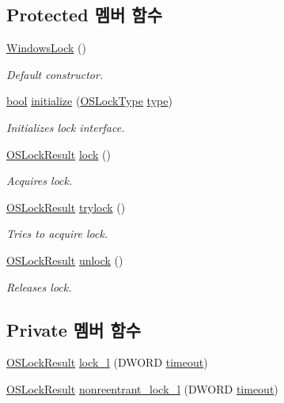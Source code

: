 \subsection*{Protected 멤버 함수}
\begin{DoxyCompactItemize}
\item 
\hyperlink{class_windows_lock_af8d42c76828ff4a315b0e2019a4e56bf}{Windows\+Lock} ()
\begin{DoxyCompactList}\small\item\em Default constructor. \end{DoxyCompactList}\item 
\hyperlink{avb__gptp_8h_af6a258d8f3ee5206d682d799316314b1}{bool} \hyperlink{class_windows_lock_abe9590069aa14b3a011b299110c7d50f}{initialize} (\hyperlink{avbts__oslock_8hpp_a88e6fcd587e202a0bf3d0318d8fff8bb}{O\+S\+Lock\+Type} \hyperlink{class_windows_lock_aeab5ee1f363ea475ef801f98a1da7838}{type})
\begin{DoxyCompactList}\small\item\em Initializes lock interface. \end{DoxyCompactList}\item 
\hyperlink{avbts__oslock_8hpp_a6ade377184a937ebffbe2a94b7369a64}{O\+S\+Lock\+Result} \hyperlink{class_windows_lock_aefc4b18353917a86c322d3831c882c09}{lock} ()
\begin{DoxyCompactList}\small\item\em Acquires lock. \end{DoxyCompactList}\item 
\hyperlink{avbts__oslock_8hpp_a6ade377184a937ebffbe2a94b7369a64}{O\+S\+Lock\+Result} \hyperlink{class_windows_lock_a098e16631cf8124ba7d5b0c8bacaddef}{trylock} ()
\begin{DoxyCompactList}\small\item\em Tries to acquire lock. \end{DoxyCompactList}\item 
\hyperlink{avbts__oslock_8hpp_a6ade377184a937ebffbe2a94b7369a64}{O\+S\+Lock\+Result} \hyperlink{class_windows_lock_ad76539cc13c8522878b489db1fb1d2f1}{unlock} ()
\begin{DoxyCompactList}\small\item\em Releases lock. \end{DoxyCompactList}\end{DoxyCompactItemize}
\subsection*{Private 멤버 함수}
\begin{DoxyCompactItemize}
\item 
\hyperlink{avbts__oslock_8hpp_a6ade377184a937ebffbe2a94b7369a64}{O\+S\+Lock\+Result} \hyperlink{class_windows_lock_a470fbe0b719b4d1c13371818c27e018a}{lock\+\_\+l} (D\+W\+O\+RD \hyperlink{aaf-listener_8c_a869c60cb165af7b6177060c00c5c416c}{timeout})
\item 
\hyperlink{avbts__oslock_8hpp_a6ade377184a937ebffbe2a94b7369a64}{O\+S\+Lock\+Result} \hyperlink{class_windows_lock_a561c148e5cb690e30ddc9f53d97b010d}{nonreentrant\+\_\+lock\+\_\+l} (D\+W\+O\+RD \hyperlink{aaf-listener_8c_a869c60cb165af7b6177060c00c5c416c}{timeout})
\end{DoxyCompactItemize}
